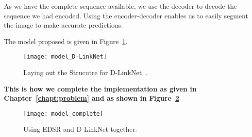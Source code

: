 As we have the complete sequence available, we use the decoder to decode the sequence we had encoded. Using the encoder-decoder enables us to easily segment the image to make accurate predictions.

The model proposed is given in Figure~\ref{fig:model_D-LinkNet}.
\begin{figure}[h!]
  \centering
  \texttt{[image: model\_D-LinkNet]}
  \caption[Laying out the Strucutre for D-LinkNet]{Laying out the Strucutre for D-LinkNet~\cite{D-LinkNet}.}
  \label{fig:model_D-LinkNet}
\end{figure}


\textbf{This is how we complete the implementation as given in Chapter~\ref{chapt:problem} and as shown in Figure~\ref{fig:model_complete}}

\begin{figure}[h!]
  \centering
  \texttt{[image: model\_complete]}
  \caption{Using EDSR and D-LinkNet together.}
  \label{fig:model_complete}
\end{figure}